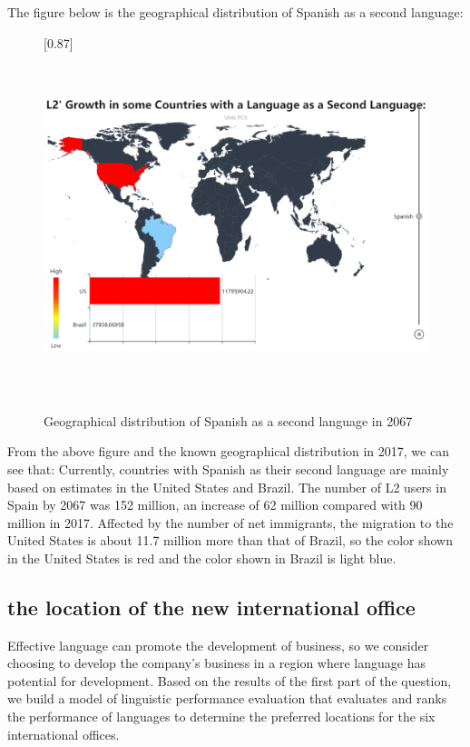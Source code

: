\par The figure below is the geographical distribution of Spanish as a second language:

\begin{figure}[htbp]
	\centering
	 \scalebox{0.87}[0.87]{%
	\includegraphics[width=1\linewidth,height=10cm]{figures/Spanish}
}
	\caption{Geographical distribution of Spanish as a second language in 2067}
	\label{fig:spanish}
\end{figure}

\par From the above figure and the known geographical distribution in 2017, we can see that: Currently, countries with Spanish as their second language are mainly based on estimates in the United States and Brazil. The number of L2 users in Spain by 2067 was 152 million, an increase of 62 million compared with 90 million in 2017. Affected by the number of net immigrants, the migration to the United States is about 11.7 million more than that of Brazil, so the color shown in the United States is red and the color shown in Brazil is light blue. 

\subsection{the location of the new international office}

\noindent Effective language can promote the development of business, so we consider choosing to develop the company's business in a region where language has potential for development. Based on the results of the first part of the question, we build a model of linguistic performance evaluation that evaluates and ranks the performance of languages to determine the preferred locations for the six international offices.

